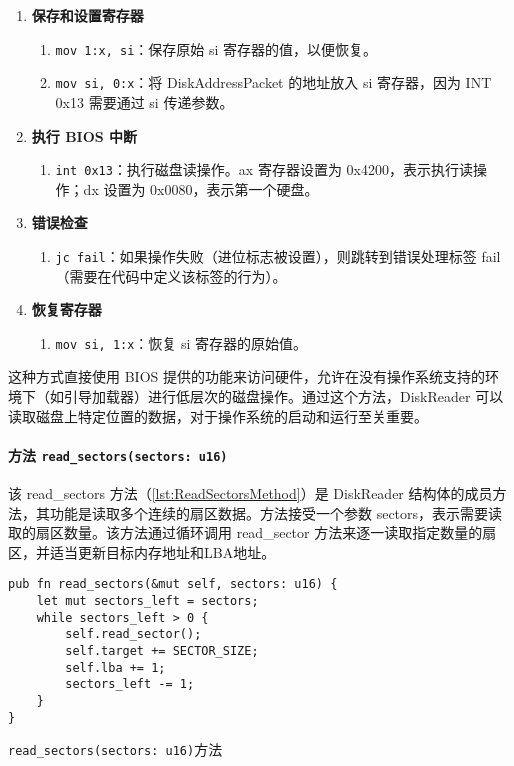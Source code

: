 \begin{enumerate}
    \item \textbf{保存和设置寄存器}
          \begin{enumerate}
              \item \texttt{mov {1:x}, si}：保存原始 si 寄存器的值，以便恢复。
              \item \texttt{mov si, {0:x}}：将 DiskAddressPacket 的地址放入 si 寄存器，因为 INT 0x13 需要通过 si 传递参数。
          \end{enumerate}
    \item \textbf{执行 BIOS 中断}
          \begin{enumerate}
              \item \texttt{int 0x13}：执行磁盘读操作。ax 寄存器设置为 0x4200，表示执行读操作；dx 设置为 0x0080，表示第一个硬盘。
          \end{enumerate}
    \item \textbf{错误检查}
          \begin{enumerate}
              \item \texttt{jc fail}：如果操作失败（进位标志被设置），则跳转到错误处理标签 fail（需要在代码中定义该标签的行为）。
          \end{enumerate}
    \item \textbf{恢复寄存器}
          \begin{enumerate}
              \item \texttt{mov si, {1:x}}：恢复 si 寄存器的原始值。
          \end{enumerate}
\end{enumerate}

这种方式直接使用 BIOS 提供的功能来访问硬件，允许在没有操作系统支持的环境下（如引导加载器）进行低层次的磁盘操作。通过这个方法，DiskReader 可以读取磁盘上特定位置的数据，对于操作系统的启动和运行至关重要。

\paragraph{方法 \texttt{read\_sectors(sectors: u16)}}

该 read\_sectors 方法（\cref{lst:ReadSectorsMethod}）是 DiskReader 结构体的成员方法，其功能是读取多个连续的扇区数据。方法接受一个参数 sectors，表示需要读取的扇区数量。该方法通过循环调用 read\_sector 方法来逐一读取指定数量的扇区，并适当更新目标内存地址和LBA地址。

\begin{listing}[htbp]
    \begin{verbatim}
pub fn read_sectors(&mut self, sectors: u16) {
    let mut sectors_left = sectors;
    while sectors_left > 0 {
        self.read_sector();
        self.target += SECTOR_SIZE;
        self.lba += 1;
        sectors_left -= 1;
    }
}
    \end{verbatim}
    \caption{\texttt{read\_sectors(sectors: u16)}方法}\label{lst:ReadSectorsMethod}
\end{listing}

